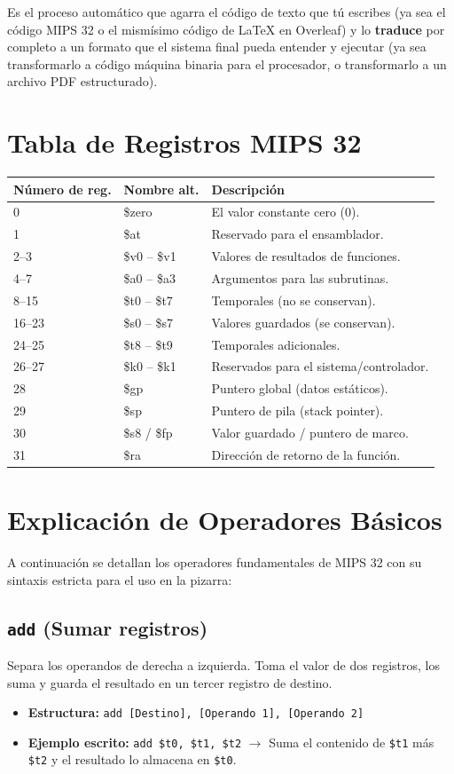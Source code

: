 \documentclass[12pt,a4paper]{article}
\begin{document}
Es el proceso automático que agarra el código de texto que tú escribes (ya sea el código MIPS 32 o el mismísimo código de LaTeX en Overleaf) y lo \textbf{traduce} por completo a un formato que el sistema final pueda entender y ejecutar (ya sea transformarlo a código máquina binaria para el procesador, o transformarlo a un archivo PDF estructurado).


\section{Tabla de Registros MIPS 32}

\begin{tabular}{lll}
\textbf{Número de reg.} & \textbf{Nombre alt.} & \textbf{Descripción} \\ \hline
0 & \$zero & El valor constante cero ($0$). \\\hline
1 & \$at & Reservado para el ensamblador. \\\hline
2--3 & \$v0 -- \$v1 & Valores de resultados de funciones. \\\hline
4--7 & \$a0 -- \$a3 & Argumentos para las subrutinas. \\\hline
8--15 & \$t0 -- \$t7 & Temporales (no se conservan). \\\hline
16--23 & \$s0 -- \$s7 & Valores guardados (se conservan). \\\hline
24--25 & \$t8 -- \$t9 & Temporales adicionales. \\\hline
26--27 & \$k0 -- \$k1 & Reservados para el sistema/controlador. \\\hline
28 & \$gp & Puntero global (datos estáticos). \\\hline
29 & \$sp & Puntero de pila (stack pointer). \\\hline
30 & \$s8 / \$fp & Valor guardado / puntero de marco. \\\hline
31 & \$ra & Dirección de retorno de la función. \\\hline
\end{tabular}

\section{Explicación de Operadores Básicos}
A continuación se detallan los operadores fundamentales de MIPS 32 con su sintaxis estricta para el uso en la pizarra:

\subsection{\texttt{add} (Sumar registros)}
Separa los operandos de derecha a izquierda. Toma el valor de dos registros, los suma y guarda el resultado en un tercer registro de destino.
\begin{itemize}
    \item \textbf{Estructura:} \texttt{add [Destino], [Operando 1], [Operando 2]}
    \item \textbf{Ejemplo escrito:} \texttt{add \$t0, \$t1, \$t2} $\rightarrow$ Suma el contenido de \texttt{\$t1} más \texttt{\$t2} y el resultado lo almacena en \texttt{\$t0}.
\end{itemize}
\end{document}
